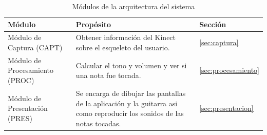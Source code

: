 \documentclass[a4paper,10pt]{article}
\begin{document}
\begin{table}[h]
        \centering
        \begin{tabularx}{\textwidth}{|p{3cm}| X |p{15mm}|}
                \hline
                \textbf{Módulo} & \textbf{Propósito} & \textbf{Sección} \\
                \hline
                Módulo de Captura (CAPT) & Obtener información del Kinect sobre el esqueleto del usuario. &\ref{sec:captura} \\
                \hline
                Módulo de Procesamiento (PROC) & Calcular el tono y volumen y ver si una nota fue tocada. &\ref{sec:procesamiento}\\
                \hline
                Módulo de Presentación (PRES) & Se encarga de dibujar las pantallas de la aplicación y la guitarra asi como reproducir los sonidos de las notas tocadas. &\ref{sec:presentacion}\\
                \hline
        \end{tabularx}
        \caption{Módulos de la arquitectura del sistema}
        \label{tab:modulos}
\end{table}
\end{document}
